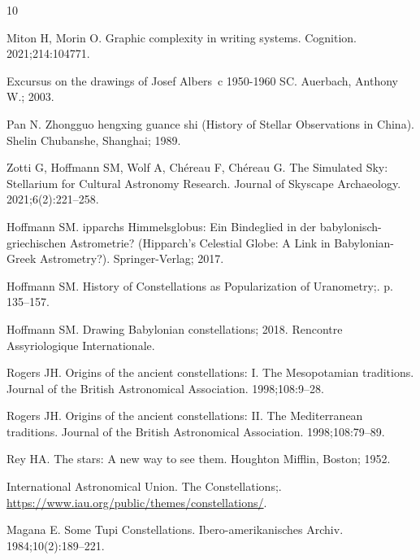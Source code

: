 \documentclass[10pt]{article}
\begin{document}
{\footnotesize

\begin{thebibliography}{10}

Miton H, Morin O.
\newblock Graphic complexity in writing systems.
\newblock Cognition. 2021;214:104771.

{E}xcursus on the drawings of {Josef Albers}~c 1950-1960 SC.
\newblock Auerbach, Anthony W.; 2003.

Pan N.
\newblock Zhongguo hengxing guance shi ({H}istory of Stellar Observations in
  {China}).
\newblock Shelin Chubanshe, Shanghai; 1989.

Zotti G, Hoffmann SM, Wolf A, Ch{\'e}reau F, Ch{\'e}reau G.
\newblock The Simulated Sky: Stellarium for Cultural Astronomy Research.
\newblock Journal of Skyscape Archaeology. 2021;6(2):221–258.

Hoffmann SM.
ipparchs {H}immelsglobus: {E}in {B}indeglied in der
  babylonisch-griechischen {A}strometrie? ({H}ipparch's Celestial Globe: {A}
  Link in {Babylonian-Greek} Astrometry?).
\newblock Springer-Verlag; 2017.

Hoffmann SM.
\newblock History of Constellations as Popularization of Uranometry;. p.
  135--157.

Hoffmann SM. Drawing {B}abylonian constellations; 2018.
\newblock Rencontre Assyriologique Internationale.

Rogers JH.
\newblock Origins of the ancient constellations: {I}. {T}he {M}esopotamian
  traditions.
\newblock Journal of the British Astronomical Association. 1998;108:9--28.

Rogers JH.
\newblock Origins of the ancient constellations: {II}. {T}he {M}editerranean
  traditions.
\newblock Journal of the British Astronomical Association. 1998;108:79--89.

Rey HA.
\newblock The stars: A new way to see them.
\newblock Houghton Mifflin, Boston; 1952.

{International Astronomical Union}. The Constellations;.
\newblock \url{https://www.iau.org/public/themes/constellations/}.

Magana E.
\newblock Some {Tupi} Constellations.
\newblock Ibero-amerikanisches Archiv. 1984;10(2):189--221.


\end{thebibliography}}
\end{document}
